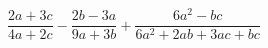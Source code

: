 \begin{ex}[type=expression]
	\begin{condition}
		\( \dfrac{2a+3c}{4a+2c}-\dfrac{2b-3a}{9a+3b}+\dfrac{6a^2-bc}{6a^2+2ab+3ac+bc} \)
	\end{condition}
\end{ex}